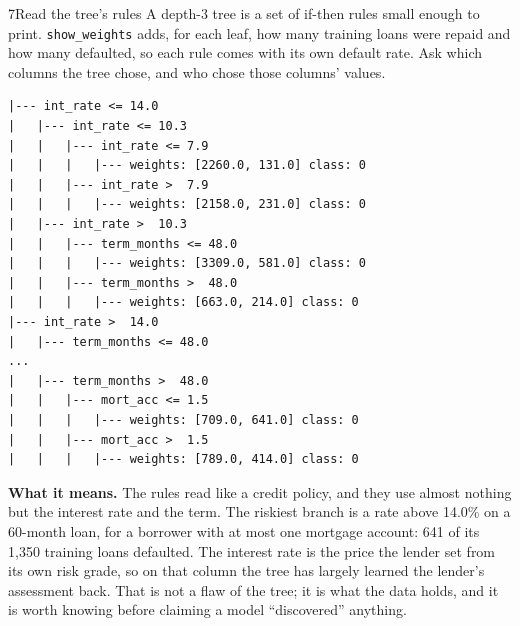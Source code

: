 \begin{labquestion}{7}{Read the tree's rules}
A depth-3 tree is a set of if-then rules small enough to print. \texttt{show\_weights} adds, for each leaf, how many training loans were repaid and how many defaulted, so each rule comes with its own default rate. Ask which columns the tree chose, and who chose those columns' values.
\end{labquestion}
\begin{labanswer}

\begin{refoutput}
\begin{lstlisting}[style=utpterminal]
|--- int_rate <= 14.0
|   |--- int_rate <= 10.3
|   |   |--- int_rate <= 7.9
|   |   |   |--- weights: [2260.0, 131.0] class: 0
|   |   |--- int_rate >  7.9
|   |   |   |--- weights: [2158.0, 231.0] class: 0
|   |--- int_rate >  10.3
|   |   |--- term_months <= 48.0
|   |   |   |--- weights: [3309.0, 581.0] class: 0
|   |   |--- term_months >  48.0
|   |   |   |--- weights: [663.0, 214.0] class: 0
|--- int_rate >  14.0
|   |--- term_months <= 48.0
...
|   |--- term_months >  48.0
|   |   |--- mort_acc <= 1.5
|   |   |   |--- weights: [709.0, 641.0] class: 0
|   |   |--- mort_acc >  1.5
|   |   |   |--- weights: [789.0, 414.0] class: 0
\end{lstlisting}
\end{refoutput}

\textbf{What it means.} The rules read like a credit policy, and they use almost nothing but the interest rate and the term. The riskiest branch is a rate above 14.0\% on a 60-month loan, for a borrower with at most one mortgage account: 641 of its 1,350 training loans defaulted. The interest rate is the price the lender set from its own risk grade, so on that column the tree has largely learned the lender's assessment back. That is not a flaw of the tree; it is what the data holds, and it is worth knowing before claiming a model ``discovered'' anything.
\end{labanswer}

